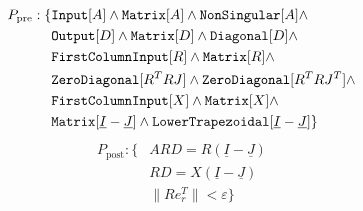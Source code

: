 %
\begin{align*}
P_\text{pre}: \{ &\text{\ttfamily Input}[A] \land \text{\ttfamily Matrix}[A] \land \text{\ttfamily NonSingular}[A] \land \\
		&\text{\ttfamily Output}[D] \land \text{\ttfamily Matrix}[D] \land \text{\ttfamily Diagonal}[D] \land \\
		&\text{\ttfamily FirstColumnInput}[R] \land \text{\ttfamily Matrix}[R] \land \\
		&\text{\ttfamily ZeroDiagonal}[R^T R J] \land \text{\ttfamily ZeroDiagonal}[R^T R J^T] \land \\
		&\text{\ttfamily FirstColumnInput}[X] \land \text{\ttfamily Matrix}[X] \land \\
		& \text{\ttfamily Matrix}[\underline{I} - \underline{J}] \land \text{\ttfamily LowerTrapezoidal}[\underline{I} - \underline{J}] \}
\end{align*}
%
\begin{align*}
P_\text{post}:	\{ 	&ARD = R \left( \underline{I} - \underline{J} \right) \\
				&RD = X \left( \underline{I} - \underline{J} \right) \\
				&\| R e_r^T \| < \varepsilon \}
\end{align*}

